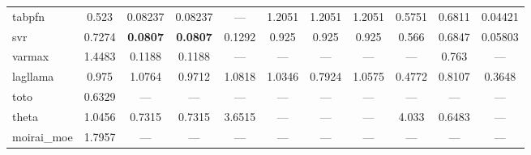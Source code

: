 \begin{table}
\begin{adjustbox}{width=0.95\textheight,center}
\begin{tabular}{lcccccccccc}
tabpfn & 0.523 & 0.08237 & 0.08237 & --- & 1.2051 & 1.2051 & 1.2051 & 0.5751 & 0.6811 & 0.04421 \\
svr & 0.7274 & \textbf{0.0807} & \textbf{0.0807} & 0.1292 & 0.925 & 0.925 & 0.925 & 0.566 & 0.6847 & 0.05803 \\
varmax & 1.4483 & 0.1188 & 0.1188 & --- & --- & --- & --- & --- & 0.763 & --- \\
lagllama & 0.975 & 1.0764 & 0.9712 & 1.0818 & 1.0346 & 0.7924 & 1.0575 & 0.4772 & 0.8107 & 0.3648 \\
toto & 0.6329 & --- & --- & --- & --- & --- & --- & --- & --- & --- \\
theta & 1.0456 & 0.7315 & 0.7315 & 3.6515 & --- & --- & --- & 4.033 & 0.6483 & --- \\
moirai\_moe & 1.7957 & --- & --- & --- & --- & --- & --- & --- & --- & --- \\
\bottomrule
\end{tabular}
\end{adjustbox}
\end{table}


